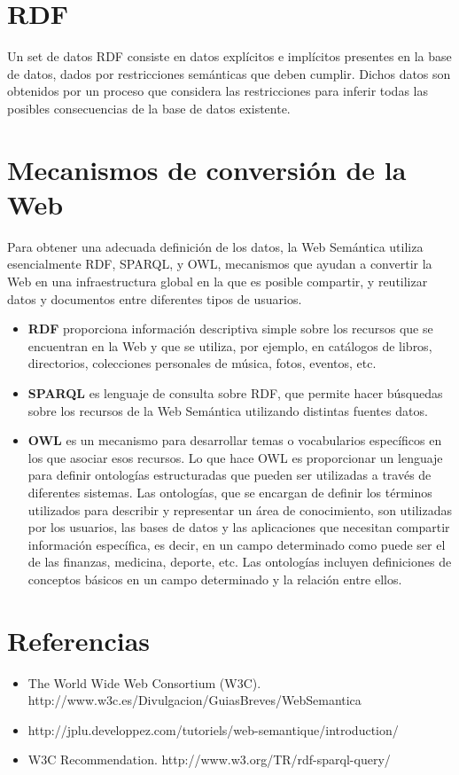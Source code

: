 \documentclass[10pt,a4paper]{article}
\begin{document}
\newpage
\section{RDF}
Un set de datos RDF consiste en datos explícitos e implícitos presentes en la base de datos, dados por restricciones semánticas que deben cumplir. Dichos datos son obtenidos por un proceso que considera las restricciones para inferir todas las posibles consecuencias de la base de datos existente.

\newpage
\section{Mecanismos de conversión de la Web}
Para obtener una adecuada definición de los datos, la Web Semántica utiliza esencialmente RDF, SPARQL, y OWL, mecanismos que ayudan a convertir la Web en una infraestructura global en la que es posible compartir, y reutilizar datos y documentos entre diferentes tipos de usuarios.

\begin{itemize}
\item \textbf{RDF} proporciona información descriptiva simple sobre los recursos que se encuentran en la Web y que se utiliza, por ejemplo, en catálogos de libros, directorios, colecciones personales de música, fotos, eventos, etc.
\item \textbf{SPARQL} es lenguaje de consulta sobre RDF, que permite hacer búsquedas sobre los recursos de la Web Semántica utilizando distintas fuentes datos.
\item \textbf{OWL} es un mecanismo para desarrollar temas o vocabularios específicos en los que asociar esos recursos. Lo que hace OWL es proporcionar un lenguaje para definir ontologías estructuradas que pueden ser utilizadas a través de diferentes sistemas. Las ontologías, que se encargan de definir los términos utilizados para describir y representar un área de conocimiento, son utilizadas por los usuarios, las bases de datos y las aplicaciones que necesitan compartir información específica, es decir, en un campo determinado como puede ser el de las finanzas, medicina, deporte, etc. Las ontologías incluyen definiciones de conceptos básicos en un campo determinado y la relación entre ellos.
\end{itemize}

\newpage

\section{Referencias}

\begin{itemize}
\item The World Wide Web Consortium (W3C). http://www.w3c.es/Divulgacion/GuiasBreves/WebSemantica
\item http://jplu.developpez.com/tutoriels/web-semantique/introduction/
\item W3C Recommendation. http://www.w3.org/TR/rdf-sparql-query/
\end{itemize}
\end{document}

